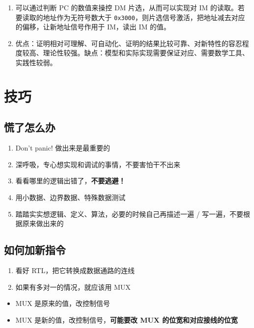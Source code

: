 \documentclass[12pt,AutoFakeBold]{article}
\providecommand{\tightlist}{%
  \setlength{\itemsep}{0pt}\setlength{\parskip}{0pt}}
\begin{document}
\begin{enumerate}
\item 可以通过判断 PC 的数值来操控 DM 片选，从而可以实现对 IM 的读取。若要读取的地址作为无符号数大于 \texttt{0x3000}，则片选信号激活，把地址减去对应的偏移，让新地址信号作用于 IM，读出 IM 的值。
\item 优点：证明相对可理解、可自动化、证明的结果比较可靠、对新特性的容忍程度较高、理论性较强。缺点：模型和实际实现需要保证对应、需要数学工具、实践性较弱。
\end{enumerate}

\hypertarget{ux6280ux5de7}{%
\section{技巧}\label{ux6280ux5de7}}

\hypertarget{ux614cux4e86ux600eux4e48ux529e}{%
\subsection{慌了怎么办}\label{ux614cux4e86ux600eux4e48ux529e}}

\begin{enumerate}
\def\labelenumi{\arabic{enumi}.}
\tightlist
\item
  Don't panic! 做出来是最重要的
\item
  深呼吸，专心想实现和调试的事情，不要害怕干不出来
\item
  看看哪里的逻辑出错了，\textbf{不要逃避！}
\item
  用小数据、边界数据、特殊数据测试
\item
  踏踏实实想逻辑、定义、算法，必要的时候自己再描述一遍 /
  写一遍，不要根据原来做出来的
\end{enumerate}

\hypertarget{ux5982ux4f55ux52a0ux65b0ux6307ux4ee4}{%
\subsection{如何加新指令}\label{ux5982ux4f55ux52a0ux65b0ux6307ux4ee4}}

\begin{enumerate}
\def\labelenumi{\arabic{enumi}.}
\tightlist
\item
  看好 RTL，把它转换成数据通路的连线
\item
  如果有多对一的情况，就应该用 MUX
\end{enumerate}

\begin{itemize}
\tightlist
\item
  MUX 是原来的值，改控制信号
\item
  MUX 是新的值，改控制信号，\textbf{可能要改 MUX 的位宽和对应接线的位宽}
\end{itemize}
\end{document}
